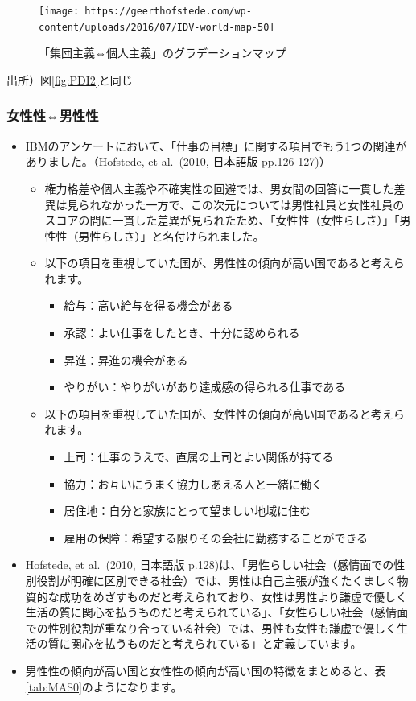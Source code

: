 \documentclass[
]{book}
\begin{document}
\begin{figure}
\texttt{[image: https://geerthofstede.com/wp-content/uploads/2016/07/IDV-world-map-50]} \caption{「集団主義⇔個人主義」のグラデーションマップ}\label{fig:IDV2}
\end{figure}

出所）図\ref{fig:PDI2}と同じ

\hypertarget{ux5973ux6027ux6027ux7537ux6027ux6027}{%
\subsubsection{女性性⇔男性性}\label{ux5973ux6027ux6027ux7537ux6027ux6027}}

\begin{itemize}
\item
  IBMのアンケートにおいて、「仕事の目標」に関する項目でもう1つの関連がありました。（Hofstede, et al.~(2010, 日本語版 pp.126-127)）

  \begin{itemize}
  \item
    権力格差や個人主義や不確実性の回避では、男女間の回答に一貫した差異は見られなかった一方で、この次元については男性社員と女性社員のスコアの間に一貫した差異が見られたため、「女性性（女性らしさ）」「男性性（男性らしさ）」と名付けられました。
  \item
    以下の項目を重視していた国が、男性性の傾向が高い国であると考えられます。

    \begin{itemize}
    \item
      給与：高い給与を得る機会がある
    \item
      承認：よい仕事をしたとき、十分に認められる
    \item
      昇進：昇進の機会がある
    \item
      やりがい：やりがいがあり達成感の得られる仕事である
    \end{itemize}
  \item
    以下の項目を重視していた国が、女性性の傾向が高い国であると考えられます。

    \begin{itemize}
    \item
      上司：仕事のうえで、直属の上司とよい関係が持てる
    \item
      協力：お互いにうまく協力しあえる人と一緒に働く
    \item
      居住地：自分と家族にとって望ましい地域に住む
    \item
      雇用の保障：希望する限りその会社に勤務することができる
    \end{itemize}
  \end{itemize}
\item
  Hofstede, et al.~(2010, 日本語版 p.128)は、「男性らしい社会（感情面での性別役割が明確に区別できる社会）では、男性は自己主張が強くたくましく物質的な成功をめざすものだと考えられており、女性は男性より謙虚で優しく生活の質に関心を払うものだと考えられている」、「女性らしい社会（感情面での性別役割が重なり合っている社会）では、男性も女性も謙虚で優しく生活の質に関心を払うものだと考えられている」と定義しています。
\item
  男性性の傾向が高い国と女性性の傾向が高い国の特徴をまとめると、表\ref{tab:MAS0}のようになります。


\end{itemize}
\end{document}

